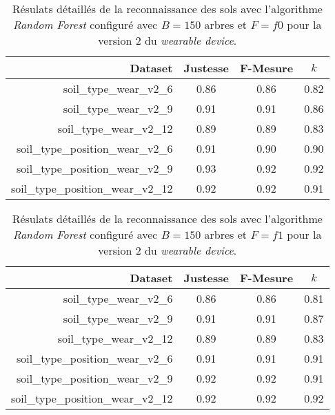 \begin{table}[H]\renewcommand{\arraystretch}{0.5}
	\centering
	\caption{Résulats détaillés de la reconnaissance des sols avec l'algorithme \textit{Random Forest} configuré avec $B=150$ arbres et $F=f0$ pour la version 2 du \textit{wearable device}.}
	\label{tab:tab:rf-150-f0-wear-v2}
	\begin{tabular}{@{}rccc@{}}
		\toprule
			\textbf{Dataset} & \textbf{Justesse} & \textbf{F-Mesure} & \textbf{$k$} \\
		\midrule
			soil\_type\_wear\_v2\_6 & 0.86 & 0.86 & 0.82 \\
			soil\_type\_wear\_v2\_9 & 0.91 & 0.91 & 0.86 \\
			soil\_type\_wear\_v2\_12 & 0.89 & 0.89 & 0.83 \\
			soil\_type\_position\_wear\_v2\_6 & 0.91 & 0.90 & 0.90 \\
			soil\_type\_position\_wear\_v2\_9 & 0.93 & 0.92 & 0.92 \\
			soil\_type\_position\_wear\_v2\_12 & 0.92 & 0.92 & 0.91 \\
		\bottomrule
	\end{tabular}
\end{table}

\begin{table}[H]\renewcommand{\arraystretch}{0.5}
	\centering
	\caption{Résulats détaillés de la reconnaissance des sols avec l'algorithme \textit{Random Forest} configuré avec $B=150$ arbres et $F=f1$ pour la version 2 du \textit{wearable device}.}
	\label{tab:tab:rf-150-f1-wear-v2}
	\begin{tabular}{@{}rccc@{}}
		\toprule
			\textbf{Dataset} & \textbf{Justesse} & \textbf{F-Mesure} & \textbf{$k$} \\
		\midrule
			soil\_type\_wear\_v2\_6 & 0.86 & 0.86 & 0.81 \\
			soil\_type\_wear\_v2\_9 & 0.91 & 0.91 & 0.87 \\
			soil\_type\_wear\_v2\_12 & 0.89 & 0.89 & 0.83 \\
			soil\_type\_position\_wear\_v2\_6 & 0.91 & 0.91 & 0.91 \\
			soil\_type\_position\_wear\_v2\_9 & 0.92 & 0.92 & 0.91 \\
			soil\_type\_position\_wear\_v2\_12 & 0.92 & 0.92 & 0.92 \\
		\bottomrule
	\end{tabular}
\end{table}

